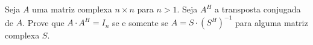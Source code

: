 Seja \(A\) uma matriz complexa \(n \times n\) para \(n > 1\). Seja \(A^{H}\) a transposta conjugada de \(A\). Prove que \(A \cdot A^{H} = I_{n}\) se e somente se \(A = S \cdot (S^{H})^{-1}\) para alguma matriz complexa \(S\).
